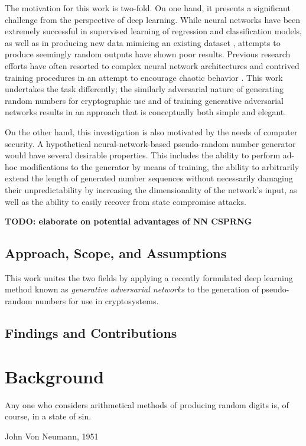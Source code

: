 \documentclass[12pt, titlepage]{report}
\theoremstyle{definition}
\begin{document}
The motivation for this work is two-fold. On one hand, it presents a significant challenge from the perspective of deep learning. While neural networks have been extremely successful in supervised learning of regression and classification models, as well as in producing new data mimicing an existing dataset \cite{goodfellow2014generative}, attempts to produce seemingly random outputs have shown poor results. Previous research efforts have often resorted to complex neural network architectures and contrived training procedures in an attempt to encourage chaotic behavior \cite{desai2011pseudo} \cite{desai2012pseudo} \cite{tirdad2010hopfield}. This work undertakes the task differently; the similarly adversarial nature of generating random numbers for cryptographic use and of training generative adversarial networks results in an approach that is conceptually both simple and elegant.

On the other hand, this investigation is also motivated by the needs of computer security. A hypothetical neural-network-based pseudo-random number generator would have several desirable properties. This includes the ability to perform ad-hoc modifications to the generator by means of training, the ability to arbitrarily extend the length of generated number sequences without necessarily damaging their unpredictability by increasing the dimensionality of the network's input, as well as the ability to easily recover from state compromise attacks.

\textbf{TODO: elaborate on potential advantages of NN CSPRNG}


\section{Approach, Scope, and Assumptions}
This work unites the two fields by applying a recently formulated deep learning method known as \emph{generative adversarial networks} to the generation of pseudo-random numbers for use in cryptosystems.


\section{Findings and Contributions}




\chapter{Background}\label{chapter:background}
\epigraph{Any one who considers arithmetical methods of producing random digits is, of course, in a state of sin.}{John Von Neumann, 1951}
\end{document}
